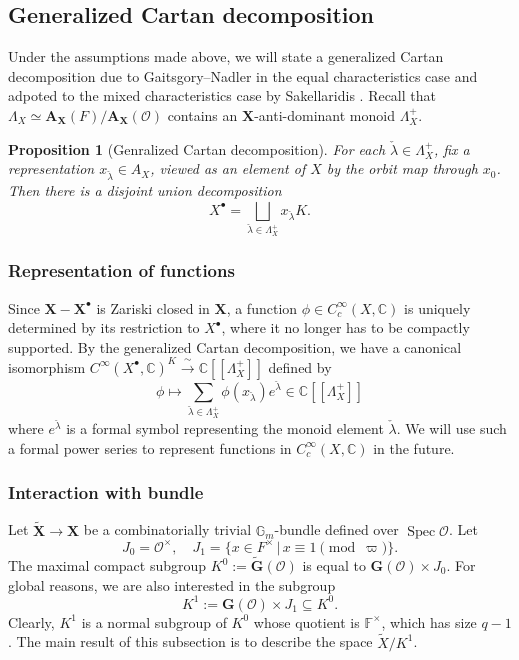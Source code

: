 \documentclass{amsart}
\newtheorem{prop}[theorem]{Proposition}
\theoremstyle{definition}
\theoremstyle{remark}
\newcommand{\1}{\mathbf{1}}
\newcommand{\C}{\mathbb{C}}
\newcommand{\F}{\mathbb{F}}
\newcommand{\G}{\mathbf{G}}
\newcommand{\iso}{\xrightarrow{\,\sim\,}}
\newcommand{\mb}[1]{\mathbf{#1}}
\newcommand{\Or}{\mathcal{O}}
\DeclareMathOperator{\spec}{Spec}
\theoremstyle{definition}
\renewcommand{\G}{\mathbb{G}}
\newcommand{\bG}{\mathbf{G}}
\begin{document}
\subsection{Generalized Cartan decomposition}
Under the assumptions made above, we will state a generalized Cartan decomposition due to Gaitsgory--Nadler in the equal characteristics case \cite[Theorem 8.2.9]{GN-Dual} and adpoted to the mixed characteristics case by Sakellaridis \cite[Theorem 2.3.8]{SakANT}. Recall that $\Lambda_X\simeq\mb{A}_{\mb{X}}(F)/\mb{A}_{\mb{X}}(\Or)$ contains an $\mb{X}$-anti-dominant monoid $\Lambda_X^+$. 
\begin{prop}[Genralized Cartan decomposition]\label{prop:GeneralCartan}
    For each $\check{\lambda}\in\Lambda_X^+$, fix a representation $x_{\check{\lambda}}\in A_X$, viewed as an element of $X$ by the orbit map through $x_0$. Then there is a disjoint union decomposition
    \[
        X^\bullet=\bigsqcup_{\check{\lambda}\in\Lambda_X^+}x_{\check\lambda} K.
    \]
\end{prop}

\subsubsection{Representation of functions}
Since $\mb{X}-\mb{X}^\bullet$ is Zariski closed in $\mb{X}$, a function $\phi\in C_c^\infty(X,\C)$ is uniquely determined by its restriction to $X^\bullet$, where it no longer has to be compactly supported. By the generalized Cartan decomposition, we have a canonical isomorphism $C^\infty(X^\bullet,\C)^K\iso\C[[\Lambda_X^+]]$ defined by
\begin{equation}\label{eqn:PowerSeries}
    \phi\mapsto\sum_{\check{\lambda}\in\Lambda_X^+}\phi(x_{\check{\lambda}})e^{\check{\lambda}}\in\C[[\Lambda_X^+]]
\end{equation}
where $e^{\check{\lambda}}$ is a formal symbol representing the monoid element $\check{\lambda}$. We will use such a formal power series to represent functions in $C_c^\infty(X,\C)$ in the future.

\subsubsection{Interaction with bundle}  
Let $\widetilde{\mb{X}}\to\mb{X}$ be a combinatorially trivial $\G_m$-bundle defined over $\spec\Or$. Let
\[
  J_0=\Or^\times,\quad J_1=\{x\in F^\times\,|\,x\equiv 1\pmod{\varpi}\}.
\]
The maximal compact subgroup $K^0:=\widetilde{\bG}(\Or)$ is equal to $\mb{G(\Or)}\times J_0$. For global reasons, we are also interested in the subgroup
\[
  K^1:=\bG(\Or)\times J_1\subseteq K^0.
\]
Clearly, $K^1$ is a normal subgroup of $K^0$ whose quotient is $\F^\times$, which has size $q-1$. The main result of this subsection is to describe the space $\widetilde{X}/K^1$.
\end{document}
